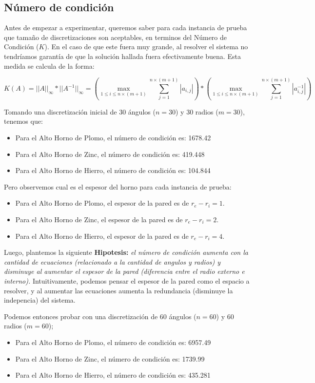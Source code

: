\subsection{Número de condición}

Antes de empezar a experimentar, queremos saber para cada instancia de prueba que tamaño de discretizaciones son aceptables, en terminos del Número de Condición ($K$).
En el caso de que este fuera muy grande, al resolver el sistema no tendríamos garantía de que la solución hallada fuera efectivamente buena. Esta medida se calcula de la forma:

$$K(A) = ||A||_{\infty} * ||A^{-1}||_{\infty} = \left( \max\limits_{1\leq i \leq n\times(m+1)}\sum_{j=1}^{n\times(m+1)}{|a_{i,j}|} \right) * \left( \max\limits_{1\leq i \leq n\times(m+1)}\sum_{j=1}^{n\times(m+1)}{|a_{i,j}^{-1}|} \right)$$

Tomando una discretización inicial de 30 ángulos ($n = 30$) y 30 radios ($m = 30$), tenemos que:
\begin{itemize}
    \item Para el Alto Horno de Plomo, el número de condición es: 1678.42
    \item Para el Alto Horno de Zinc, el número de condición es: 419.448
    \item Para el Alto Horno de Hierro, el número de condición es: 104.844
\end{itemize}

Pero observemos cual es el espesor del horno para cada instancia de prueba:
\begin{itemize}
    \item Para el Alto Horno de Plomo, el espesor de la pared es de $r_e - r_i = 1$.
    \item Para el Alto Horno de Zinc, el espesor de la pared es de $r_e - r_i = 2$.
    \item Para el Alto Horno de Hierro, el espesor de la pared es de $r_e - r_i = 4$.
\end{itemize}

Luego, plantemos la siguiente \textbf{Hipotesis:} \textit{el número de condición aumenta con la cantidad de ecuaciones (relacionado a la cantidad de angulos y radios) y disminuye al aumentar el espesor de la pared (diferencia entre el radio externo e interno).} Intuitivamente, podemos pensar el espesor de la pared como el espacio a resolver, y al aumentar las ecuaciones aumenta la redundancia (disminuye la indepencia) del sistema.

Podemos entonces probar con una discretización de 60 ángulos ($n = 60$) y 60 radios ($m = 60$);
\begin{itemize}
    \item Para el Alto Horno de Plomo, el número de condición es: 6957.49
    \item Para el Alto Horno de Zinc, el número de condición es: 1739.99
    \item Para el Alto Horno de Hierro, el número de condición es: 435.281
\end{itemize}

